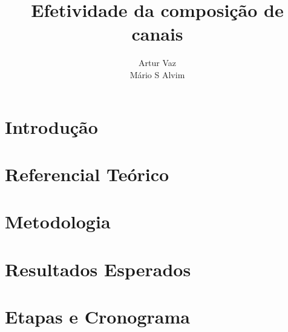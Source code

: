 \documentclass[runningheads,a4paper]{llncs2e/llncs}
\begin{document}
\mainmatter  %

\title{Efetividade da composição de canais}


%
%
\author{Artur Vaz\\
Mário S Alvim}
%


%
%

\maketitle

\section{Introdução}
\label{sec:introducao}


\section{Referencial Teórico}
\label{sec:referencial_teorico}


\section{Metodologia}
\label{sec:metodologia}


\section{Resultados Esperados}
\label{sec:resultados}


\section{Etapas e Cronograma}
\label{sec:etapas}





\appendix
%

%
\end{document}
